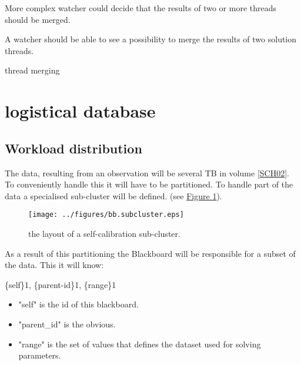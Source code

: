 \documentclass[]{lofar}
\begin{document}
          More complex watcher could decide that the results of two or
          more threads should be merged.

          \begin{requirement}
            A watcher should be able to see a possibility to merge the
            results of two solution threads.
            \caption{thread merging\label{req:merge}}
          \end{requirement}

  \section{logistical database}
  \label{sec:logistical-datamodel}
  \hypertarget{sec:logistical-datamodel}{}

    \subsection{Workload distribution}
    \label{subsec:workload-distribution-2}\hypertarget{subsec:workload-distribution-2}{}

      The data, resulting from an observation will be several TB in
      volume
      \hyperlink{bib:LOFAR-ASTRON-MEM-035}{[SCH02]}. To
      conveniently handle this it will have to be partitioned. To
      handle part of the data a specialised sub-cluster will be
      defined. (see \hyperlink{fig:bb.subcluster}{Figure \ref{fig:bb.subcluster}}).

      \begin{figure}
        \texttt{[image: ../figures/bb.subcluster.eps]}
        \hypertarget{fig:bb.subcluster}{}
        \caption{the layout of a self-calibration sub-cluster.\label{fig:bb.subcluster}}
      \end{figure}

      As a result of this partitioning the Blackboard will be
      responsible for a subset of the data. This it will know:

      \{self\}1, \{parent-id\}1, \{range\}1

      \begin{itemize}

        \item 

          "self" is the id of this blackboard.

        \item 

          "parent\_id" is the obvious.

        \item 

          "range" is the set of values that defines the dataset used
          for solving parameters.

      \end{itemize}
\end{document}
